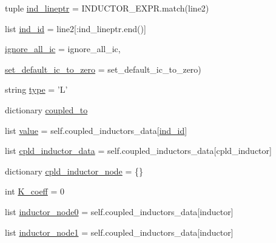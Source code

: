 \begin{DoxyCompactItemize}
\item 
tuple \hyperlink{classsage__circuit__analysis_1_1SmallSignalLinearCircuit_aa045da71701aadbb57ef81c21fe7235f}{ind\-\_\-lineptr} = I\-N\-D\-U\-C\-T\-O\-R\-\_\-\-E\-X\-P\-R.\-match(line2)
\item 
list \hyperlink{classsage__circuit__analysis_1_1SmallSignalLinearCircuit_a82e6a3b8c901095d370e58ac0a0f467d}{ind\-\_\-id} = line2\mbox{[}\-:ind\-\_\-lineptr.\-end()\mbox{]}
\item 
\hyperlink{classsage__circuit__analysis_1_1SmallSignalLinearCircuit_a49efaff802c990c307d76328be61bcc0}{ignore\-\_\-all\-\_\-ic} = ignore\-\_\-all\-\_\-ic,
\item 
\hyperlink{classsage__circuit__analysis_1_1SmallSignalLinearCircuit_a4631eadabfed776f026004c799a0ebcb}{set\-\_\-default\-\_\-ic\-\_\-to\-\_\-zero} = set\-\_\-default\-\_\-ic\-\_\-to\-\_\-zero)
\item 
string \hyperlink{classsage__circuit__analysis_1_1SmallSignalLinearCircuit_a290c9e4b629f2145df24cd8fd369ec57}{type} = 'L'
\item 
dictionary \hyperlink{classsage__circuit__analysis_1_1SmallSignalLinearCircuit_a9797e65af0cef424fd7e514ded67854c}{coupled\-\_\-to}
\item 
list \hyperlink{classsage__circuit__analysis_1_1SmallSignalLinearCircuit_a75969708c9b719729e1e334f146a4e92}{value} = self.\-coupled\-\_\-inductors\-\_\-data\mbox{[}\hyperlink{classsage__circuit__analysis_1_1SmallSignalLinearCircuit_a82e6a3b8c901095d370e58ac0a0f467d}{ind\-\_\-id}\mbox{]}
\item 
list \hyperlink{classsage__circuit__analysis_1_1SmallSignalLinearCircuit_ae12c94c0a4cee8ca416fc9895b68d57f}{cpld\-\_\-inductor\-\_\-data} = self.\-coupled\-\_\-inductors\-\_\-data\mbox{[}cpld\-\_\-inductor\mbox{]}
\item 
dictionary \hyperlink{classsage__circuit__analysis_1_1SmallSignalLinearCircuit_ac3a317f5bf6cb5aa26bd44881904130c}{cpld\-\_\-inductor\-\_\-node} = \{\}
\item 
int \hyperlink{classsage__circuit__analysis_1_1SmallSignalLinearCircuit_a31b504e6f11875560fc819cc591a5283}{K\-\_\-coeff} = 0
\item 
list \hyperlink{classsage__circuit__analysis_1_1SmallSignalLinearCircuit_a312e37d45615698fd4f29220fab24d7f}{inductor\-\_\-node0} = self.\-coupled\-\_\-inductors\-\_\-data\mbox{[}inductor\mbox{]}
\item 
list \hyperlink{classsage__circuit__analysis_1_1SmallSignalLinearCircuit_ace8f665b6eea554df79bfed3fecbca90}{inductor\-\_\-node1} = self.\-coupled\-\_\-inductors\-\_\-data\mbox{[}inductor\mbox{]}

\end{DoxyCompactItemize}
